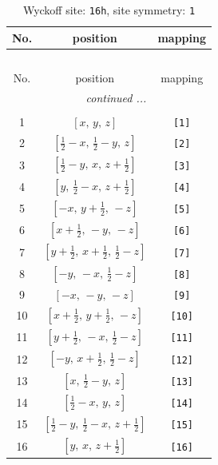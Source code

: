 \documentclass[fleqn,8pt]{jsarticle}
\begin{document}
\begin{longtable}{ccc}
\caption{Wyckoff site: {\tt 16h}, site symmetry: {\tt 1}}
 \\
 \hline \hline
No. & position & mapping \\ \hline \endfirsthead

\multicolumn{2}{l}{\tablename\ \thetable{}} \\
 \hline \hline
No. & position & mapping \\ \hline \endhead

 \hline \hline
\multicolumn{2}{r}{\footnotesize\it continued ...} \\ \endfoot

 \hline \hline
\multicolumn{2}{r}{} \\ \endlastfoot

1 & $\left[ x,\, y,\, z \right]$ & {\tt [1]} \\ \hline
2 & $\left[ \frac{1}{2} - x,\, \frac{1}{2} - y,\, z \right]$ & {\tt [2]} \\ \hline
3 & $\left[ \frac{1}{2} - y,\, x,\, z + \frac{1}{2} \right]$ & {\tt [3]} \\ \hline
4 & $\left[ y,\, \frac{1}{2} - x,\, z + \frac{1}{2} \right]$ & {\tt [4]} \\ \hline
5 & $\left[ - x,\, y + \frac{1}{2},\, - z \right]$ & {\tt [5]} \\ \hline
6 & $\left[ x + \frac{1}{2},\, - y,\, - z \right]$ & {\tt [6]} \\ \hline
7 & $\left[ y + \frac{1}{2},\, x + \frac{1}{2},\, \frac{1}{2} - z \right]$ & {\tt [7]} \\ \hline
8 & $\left[ - y,\, - x,\, \frac{1}{2} - z \right]$ & {\tt [8]} \\ \hline
9 & $\left[ - x,\, - y,\, - z \right]$ & {\tt [9]} \\ \hline
10 & $\left[ x + \frac{1}{2},\, y + \frac{1}{2},\, - z \right]$ & {\tt [10]} \\ \hline
11 & $\left[ y + \frac{1}{2},\, - x,\, \frac{1}{2} - z \right]$ & {\tt [11]} \\ \hline
12 & $\left[ - y,\, x + \frac{1}{2},\, \frac{1}{2} - z \right]$ & {\tt [12]} \\ \hline
13 & $\left[ x,\, \frac{1}{2} - y,\, z \right]$ & {\tt [13]} \\ \hline
14 & $\left[ \frac{1}{2} - x,\, y,\, z \right]$ & {\tt [14]} \\ \hline
15 & $\left[ \frac{1}{2} - y,\, \frac{1}{2} - x,\, z + \frac{1}{2} \right]$ & {\tt [15]} \\ \hline
16 & $\left[ y,\, x,\, z + \frac{1}{2} \right]$ & {\tt [16]} \\
\end{longtable}
\end{document}
